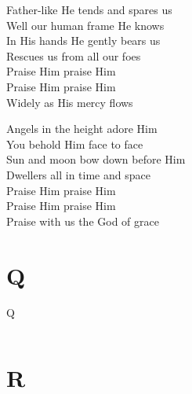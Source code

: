 \documentclass{beamer}
\begin{document}
{\begin{frame}{}
\end{frame}

\hypertarget{Praise, my soul, the King of heaven[]3}{}
\begin{frame}{}
\fontsize{ 20 }{ 27 }\selectfont

Father-like He tends and spares us\\ 
Well our human frame He knows\\ 
In His hands He gently bears us\\ 
Rescues us from all our foes\\ 
Praise Him praise Him\\ 
Praise Him praise Him\\ 
Widely as His mercy flows 

\end{frame}

\hypertarget{Praise, my soul, the King of heaven[]4}{}
\begin{frame}{}
\fontsize{ 20 }{ 27 }\selectfont

Angels in the height adore Him\\ 
You behold Him face to face\\ 
Sun and moon bow down before Him\\ 
Dwellers all in time and space\\ 
Praise Him praise Him\\ 
Praise Him praise Him\\ 
Praise with us the God of grace 

\end{frame}

}
 
\section{Q}

\begin{frame}{Q}
\begin{columns}

    


    


\end{columns}

\end{frame}

\section{R}
\end{document}
